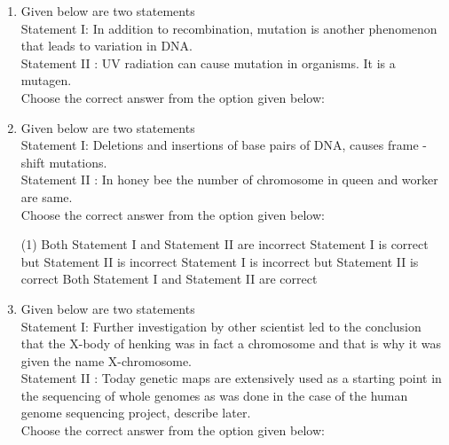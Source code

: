 \documentclass[twocolumn]{article}
\begin{document}
\begin{enumerate}
    Choose the correct answer from the option given below:
        \begin{tasks}(1)
            \task Both Statement I and Statement II are incorrect
            \task Statement I is correct but Statement II is incorrect
            \task Statement I is incorrect but Statement II is correct
            \task Both Statement I and Statement II are correct
        \end{tasks}
    \item Given below are two statements\\
    Statement I: In addition to recombination, mutation is another phenomenon that leads to variation in DNA.\\
    Statement II : UV radiation can cause mutation in organisms. It is a mutagen.\\
    Choose the correct answer from the option given below:
    \item Given below are two statements\\
    Statement I: Deletions and insertions of base pairs of DNA, causes frame - shift mutations.\\
    Statement II : In honey bee the number of chromosome in queen and worker are same.\\
    Choose the correct answer from the option given below:
        \begin{tasks}(1)
            \task Both Statement I and Statement II are incorrect
            \task Statement I is correct but Statement II is incorrect
            \task Statement I is incorrect but Statement II is correct
            \task Both Statement I and Statement II are correct
        \end{tasks}
    \item Given below are two statements\\
    Statement I: Further investigation by other scientist led to the conclusion that the X-body of henking was in fact a chromosome and that is why it was given the name X-chromosome.\\
    Statement II : Today genetic maps are extensively used as a starting point in the sequencing of whole genomes as was done in the case of the human genome sequencing project, describe later.\\
    Choose the correct answer from the option given below:

\end{enumerate}
\end{document}
